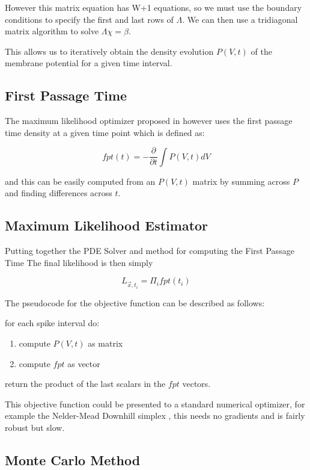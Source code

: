 \documentclass[10pt]{article}
\begin{document}
However this matrix equation has W+1 equations, so we must use the
boundary conditions to specify the first and last rows of $\Lambda$.
We can then use a tridiagonal matrix algorithm to solve $\Lambda \chi
= \beta$.

This allows us to iteratively obtain the density evolution $P(V,t)$ of the
membrane potential for a given time interval.

\subsection{First Passage Time}

The maximum likelihood optimizer proposed in
\cite{PaninskiPillowSimoncelli} however uses the first passage time
density at a given time point which is defined as:

\begin{equation}
    fpt(t) = -\frac{\partial}{\partial t} \int P(V,t)dV
\end{equation}

and this can be easily computed from an $P(V,t)$ matrix by summing
across $P$ and finding differences across $t$.

\subsection{Maximum Likelihood Estimator}

Putting together the PDE Solver and method for computing the First
Passage Time 
The final likelihood is then simply

\begin{equation}
    L_{\vec{x},t_{i}} = \Pi_{i} fpt(t_{i})
\end{equation}


The pseudocode for the objective function can be described as follows:

for each spike interval do:
\begin{enumerate}
    \item compute $P(V,t)$ as matrix
    \item compute $fpt$ as vector
\end{enumerate}
return the product of the last scalars in the $fpt$ vectors.

This objective function could be presented to a standard numerical
optimizer, for example the Nelder-Mead Downhill simplex \cite{press},
this needs no gradients and is fairly robust but slow.

\subsection{Monte Carlo Method}
\end{document}
